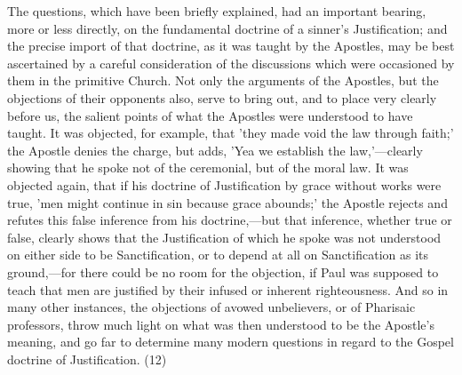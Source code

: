 \documentclass[
]{book}
\begin{document}
The questions, which have been briefly explained, had an important bearing, more or less directly, on the fundamental doctrine of a sinner's Justification; and the precise import of that doctrine, as it was taught by the Apostles, may be best ascertained by a careful consideration of the discussions which were occasioned by them in the primitive Church. Not only the arguments of the Apostles, but the objections of their opponents also, serve to bring out, and to place very clearly before us, the salient points of what the Apostles were understood to have taught. It was objected, for example, that 'they made void the law through faith;' the Apostle denies the charge, but adds, 'Yea we establish the law,'---clearly showing that he spoke not of the ceremonial, but of the moral law. It was objected again, that if his doctrine of Justification by grace without works were true, 'men might continue in sin because grace abounds;' the Apostle rejects and refutes this false inference from his doctrine,---but that inference, whether true or false, clearly shows that the Justification of which he spoke was not understood on either side to be Sanctification, or to depend at all on Sanctification as its ground,---for there could be no room for the objection, if Paul was supposed to teach that men are justified by their infused or inherent righteousness. And so in many other instances, the objections of avowed unbelievers, or of Pharisaic professors, throw much light on what was then understood to be the Apostle's meaning, and go far to determine many modern questions in regard to the Gospel doctrine of Justification. (12)
\end{document}
